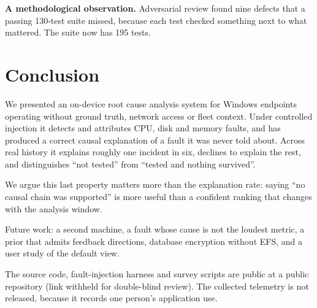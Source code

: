\documentclass[conference,a4paper]{IEEEtran}
\begin{document}
\textbf{A methodological observation.} Adversarial review found nine defects
that a passing 130-test suite missed, because each test checked something next
to what mattered. The suite now has 195 tests.

\section{Conclusion}

We presented an on-device root cause analysis system for Windows endpoints
operating without ground truth, network access or fleet context. Under
controlled injection it detects and attributes CPU, disk and memory faults, and
has produced a correct causal explanation of a fault it was never told about.
Across real history it explains roughly one incident in six, declines to
explain the rest, and distinguishes ``not tested'' from ``tested and nothing
survived''.

We argue this last property matters more than the explanation rate: saying
``no causal chain was supported'' is more useful than a confident ranking that
changes with the analysis window.

Future work: a second machine, a fault whose cause is not the loudest metric,
a prior that admits feedback directions, database encryption without EFS, and
a user study of the default view.

The source code, fault-injection harness and survey scripts are public at
a public repository (link withheld for double-blind review). The collected
telemetry is not released, because it records one person's application use.
\end{document}
